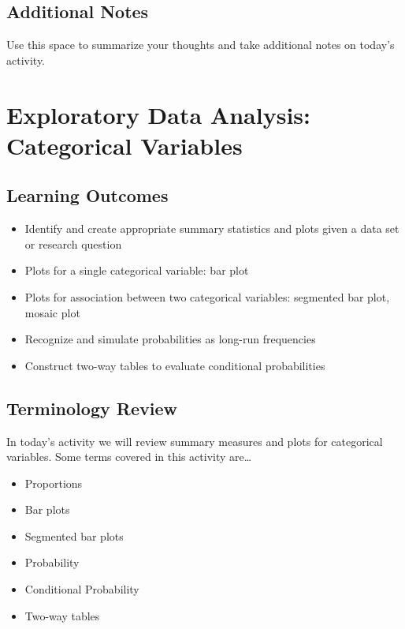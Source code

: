 \documentclass[
]{report}
\begin{document}
\hypertarget{additional-notes-1}{%
\section{Additional Notes}\label{additional-notes-1}}

Use this space to summarize your thoughts and take additional notes on today's activity.

\hypertarget{exploratory-data-analysis-categorical-variables}{%
\chapter{Exploratory Data Analysis: Categorical Variables}\label{exploratory-data-analysis-categorical-variables}}

\hypertarget{learning-outcomes-2}{%
\section{Learning Outcomes}\label{learning-outcomes-2}}

\begin{itemize}
\item
  Identify and create appropriate summary statistics and plots
  given a data set or research question
\item
  Plots for a single categorical variable: bar plot
\item
  Plots for association between two categorical variables:
  segmented bar plot, mosaic plot
\item
  Recognize and simulate probabilities as long-run frequencies
\item
  Construct two-way tables to evaluate conditional probabilities
\end{itemize}

\hypertarget{terminology-review-1}{%
\section{Terminology Review}\label{terminology-review-1}}

In today's activity we will review summary measures and plots for categorical variables. Some terms covered in this activity are\ldots{}

\begin{itemize}
\item
  Proportions
\item
  Bar plots
\item
  Segmented bar plots
\item
  Probability
\item
  Conditional Probability
\item
  Two-way tables
\end{itemize}
\end{document}
